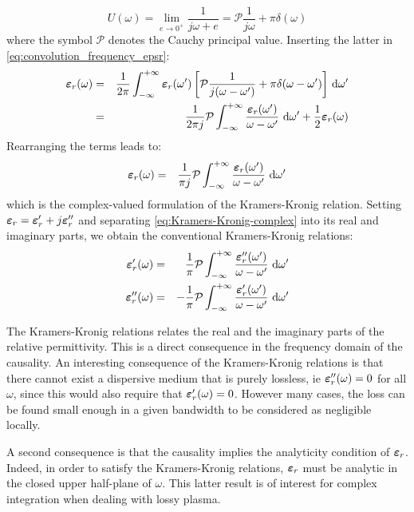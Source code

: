 \begin{equation}
 U(\omega) = \lim_{e\to 0^+} \frac{1}{j\omega + e} = \mathcal{P}\frac{1}{j\omega} + \pi \delta(\omega)
\end{equation}
where the symbol $\mathcal{P}$ denotes the Cauchy principal value. Inserting the latter in \ref{eq:convolution_frequency_epsr}:
\begin{eqnarray}
 \boldsymbol{\varepsilon}_r(\omega) 
 &=& 
 \frac{1}{2\pi} \int_{-\infty}^{+\infty}
  \boldsymbol{\varepsilon}_r(\omega') 
  \left[
    \mathcal{P}\frac{1}{j(\omega-\omega')} + \pi \delta(\omega - \omega')
  \right]
  \, \mathop{}\!\mathrm{d} \omega'
\\
&=&
 \frac{1}{2\pi j} 
 \mathcal{P}
 \int_{-\infty}^{+\infty}
    \frac{\boldsymbol{\varepsilon}_r(\omega')}{\omega-\omega'} 
  \, \mathop{}\!\mathrm{d} \omega'
  + \frac{1}{2} \boldsymbol{\varepsilon}_r(\omega)
\end{eqnarray}
Rearranging the terms leads to:
\begin{eqnarray}
  \label{eq:Kramers-Kronig-complex}
 \boldsymbol{\varepsilon}_r(\omega) 
 &=& 
 \frac{1}{\pi j} 
 \mathcal{P}
 \int_{-\infty}^{+\infty}
    \frac{\boldsymbol{\varepsilon}_r(\omega')}{\omega-\omega'} 
  \, \mathop{}\!\mathrm{d} \omega'
\end{eqnarray}
which is the complex-valued formulation of the Kramers-Kronig relation. Setting $\boldsymbol{\varepsilon}_r = \boldsymbol{\varepsilon}_r' + j \boldsymbol{\varepsilon}_r''$ and separating \ref{eq:Kramers-Kronig-complex} into its real and imaginary parts, we obtain the conventional Kramers-Kronig relations:
\begin{eqnarray}
 \boldsymbol{\varepsilon}_r'(\omega) 
 &=& 
 \frac{1}{\pi} 
 \mathcal{P}
 \int_{-\infty}^{+\infty}
    \frac{\boldsymbol{\varepsilon}_r''(\omega')}{\omega-\omega'} 
  \, \mathop{}\!\mathrm{d} \omega'
 \\
 \boldsymbol{\varepsilon}_r''(\omega) 
 &=& 
 -\frac{1}{\pi} 
 \mathcal{P}
 \int_{-\infty}^{+\infty}
    \frac{\boldsymbol{\varepsilon}_r'(\omega')}{\omega-\omega'} 
  \, \mathop{}\!\mathrm{d} \omega'
  \label{eq:Kramers-Kronig}
\end{eqnarray}

The Kramers-Kronig relations relates the real and the imaginary parts of the relative permittivity. This is a direct consequence in the frequency domain of the causality. An interesting consequence of the Kramers-Kronig relations is that there cannot exist a dispersive medium that is purely lossless, ie $\boldsymbol{\varepsilon}_r''(\omega)=0$ for all $\omega$, since this would also require that $\boldsymbol{\varepsilon}_r'(\omega)=0$. However many cases, the loss can be found small enough in a given bandwidth to be considered as negligible locally.    

A second consequence is that the causality implies the analyticity condition of $\boldsymbol{\varepsilon}_r$. Indeed, in order to satisfy the Kramers-Kronig relations, $\boldsymbol{\varepsilon}_r$ must be analytic in the closed upper half-plane of $\omega$. This latter result is of interest for complex integration when dealing with lossy plasma\parencite{Brambilla1998}. 

